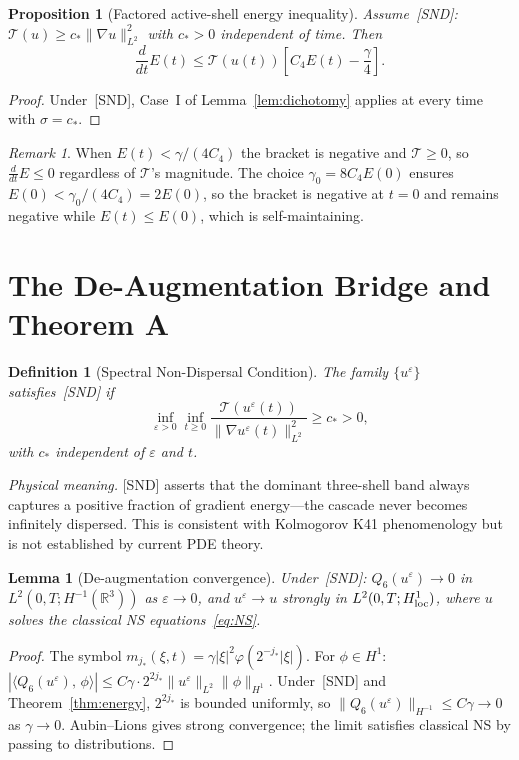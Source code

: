 \documentclass[12pt]{amsart}
\newtheorem{lemma}[theorem]{Lemma}
\newtheorem{proposition}[theorem]{Proposition}
\newtheorem{definition}[theorem]{Definition}
\theoremstyle{remark}
\newtheorem{remark}[theorem]{Remark}
\newcommand{\R}{\mathbb{R}}
\newcommand{\Tcal}{\mathcal{T}}
\newcommand{\Qsix}{Q_6}
\newcommand{\ip}[2]{\langle #1,\, #2 \rangle}
\newcommand{\eps}{\varepsilon}
\begin{document}
\begin{proposition}[Factored active-shell energy inequality]
\label{prop:factored}
Assume~\textup{[SND]}: $\Tcal(u)\ge c_*\|\nabla u\|_{L^2}^2$ with
$c_*>0$ independent of time.  Then
\[
  \frac{d}{dt}E(t)\le\Tcal(u(t))\!\left[C_4 E(t)-\frac{\gamma}{4}\right].
\]
\end{proposition}
\begin{proof}
Under~[SND], Case~I of Lemma~\ref{lem:dichotomy} applies at every time
with $\sigma=c_*$.
\end{proof}

\begin{remark}
When $E(t)<\gamma/(4C_4)$ the bracket is negative and $\Tcal\ge 0$,
so $\frac{d}{dt}E\le 0$ regardless of $\Tcal$'s magnitude.
The choice $\gamma_0=8C_4E(0)$ ensures
$E(0)<\gamma_0/(4C_4)=2E(0)$, so the bracket is negative at $t=0$
and remains negative while $E(t)\le E(0)$, which is self-maintaining.
\end{remark}

\section{The De-Augmentation Bridge and Theorem A}
\label{sec:deaug}

\begin{definition}[Spectral Non-Dispersal Condition]\label{def:SND}
The family $\{u^\eps\}$ satisfies~\textup{[SND]} if
\[
  \inf_{\eps>0}\inf_{t\ge 0}
  \frac{\Tcal(u^\eps(t))}{\|\nabla u^\eps(t)\|_{L^2}^2}
  \ge c_*>0,
\]
with $c_*$ independent of $\eps$ and $t$.
\end{definition}

\noindent\textit{Physical meaning.}
[SND] asserts that the dominant three-shell band always captures a
positive fraction of gradient energy---the cascade never becomes
infinitely dispersed.  This is consistent with Kolmogorov K41
phenomenology but is not established by current PDE theory.

\begin{lemma}[De-augmentation convergence]\label{lem:deaug}
Under~\textup{[SND]}: $\Qsix(u^\eps)\to 0$ in $L^2(0,T;H^{-1}(\R^3))$
as $\eps\to 0$, and $u^\eps\to u$ strongly in $L^2(0,T;H^1_{\rm loc})$,
where $u$ solves the classical NS equations~\eqref{eq:NS}.
\end{lemma}
\begin{proof}
The symbol $m_{j_*}(\xi,t)=\gamma|\xi|^2\varphi(2^{-j_*}|\xi|)$.
For $\phi\in H^1$:
$|\ip{\Qsix(u^\eps)}{\phi}|\le C\gamma\cdot 2^{2j_*}\|u^\eps\|_{L^2}\|\phi\|_{H^1}$.
Under~[SND] and Theorem~\ref{thm:energy}, $2^{2j_*}$ is bounded
uniformly, so $\|\Qsix(u^\eps)\|_{H^{-1}}\le C\gamma\to 0$ as $\gamma\to 0$.
Aubin--Lions gives strong convergence; the limit satisfies classical NS
by passing to distributions.
\end{proof}
\end{document}
